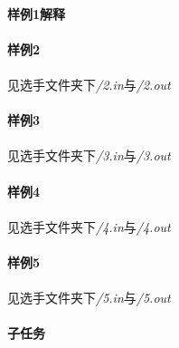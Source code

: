 \documentclass[UTF8]{ctexart}
\begin{document}
\paragraph{样例1解释}
\paragraph{}
\paragraph{样例2}
\paragraph{}见选手文件夹下\emph{/2.in}与\emph{/2.out}
\paragraph{样例3}
\paragraph{}见选手文件夹下\emph{/3.in}与\emph{/3.out}
\paragraph{样例4}
\paragraph{}见选手文件夹下\emph{/4.in}与\emph{/4.out}
\paragraph{样例5}
\paragraph{}见选手文件夹下\emph{/5.in}与\emph{/5.out}
\clearpage
\paragraph{子任务}
\paragraph{}
\end{document}
